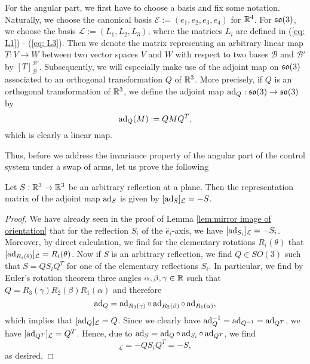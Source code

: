 For the angular part, we first have to choose a basis and fix some notation. Naturally, we choose the canonical basis $\mathcal{E} := (e_1, e_2, e_3, e_4)$ for $\mathbb{R}^4$. For $\mathfrak{so}(3)$, we choose the basis $\mathcal{L} := (L_1, L_2, L_3)$, where the matrices $L_i$ are defined in (\ref{eq: L1}) - (\ref{eq: L3}). Then we denote the matrix representing an arbitrary linear map $T: V \to W$ between two vector spaces $V$ and $W$ with respect to two bases $\mathcal{B}$ and $\mathcal{B}'$ by $[T]_{\mathcal{B}}^{\mathcal{B}'}$. Subsequently, we will especially make use of the adjoint map on $\mathfrak{so}(3)$ associated to an orthogonal transformation $Q$ of $\mathbb{R}^3$. More precisely, if $Q$ is an orthogonal transformation of $\mathbb{R}^3$, we define the adjoint map $\operatorname{ad}_Q : \mathfrak{so}(3) \to \mathfrak{so}(3)$ by
\begin{equation}
\operatorname{ad}_Q(M) := Q M Q^T,
\end{equation}
which is clearly a linear map.

Thus, before we address the invariance property of the angular part of the control system under a swap of arms, let us prove the following

\begin{lemma}
\label{lem:representation matrix of adjoint of reflection}
Let $S: \mathbb{R}^3 \to \mathbb{R}^3$ be an arbitrary reflection at a plane. Then the representation matrix of the adjoint map $\operatorname{ad}_S$ is given by $[\operatorname{ad}_S]_{\mathcal{L}} = -S$.
\end{lemma}


\begin{proof}
We have already seen in the proof of Lemma \ref{lem:mirror image of orientation} that for the reflection $S_i$ of the $\hat{e}_i$-axis, we have $[\operatorname{ad}_{S_i}]_{\mathcal{L}} = -S_i$. Moreover, by direct calculation, we find for the elementary rotations $R_i(\theta)$ that $[\operatorname{ad}_{R_i(\theta)}]_{\mathcal{L}} = R_{i}(\theta)$. Now if $S$ is an arbitrary reflection, we find $Q \in SO(3)$ such that $S = Q S_i Q^T$ for one of the elementary reflections $S_i$. In particular, we find by Euler's rotation theorem three angles $\alpha, \beta, \gamma \in \mathbb{R}$ such that $Q = R_{3}(\gamma) R_{2}(\beta) R_{1}(\alpha)$ and therefore
\begin{equation}
\operatorname{ad}_Q = \operatorname{ad}_{R_3(\gamma)} \circ \operatorname{ad}_{R_{2}(\beta)} \circ \operatorname{ad}_{R_{1}(\alpha)},
\end{equation}
which implies that $[\operatorname{ad}_{Q}]_{\mathcal{L}} = Q$. Since we clearly have $\operatorname{ad}_{Q}^{-1} = \operatorname{ad}_{Q^{-1}} = \operatorname{ad}_{Q^T}$, we have $[\operatorname{ad}_{Q^T}]_{\mathcal{L}} = Q^T$. Hence, due to $\operatorname{ad}_S = \operatorname{ad}_Q \circ \operatorname{ad}_{S_i} \circ \operatorname{ad}_{Q^T}$, we find
\begin{equation}
[\ad_S]_{\mathcal{L}} = - Q S_i Q^T = -S,
\end{equation}
as desired.
\end{proof}

